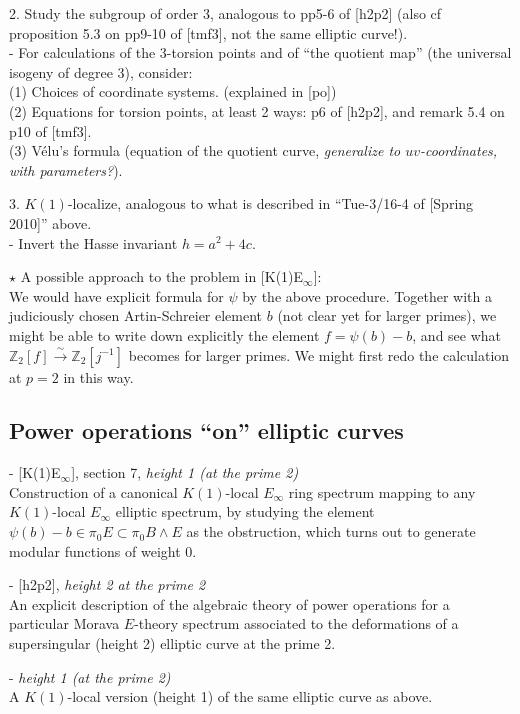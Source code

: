 \documentclass{rs}
\theoremstyle{definition}
\theoremstyle{remark}
\renewcommand{\=}{\approx}
\renewcommand{\-}{\sim}
\numberwithin{equation}{section}
\numberwithin{thm}{section}
\begin{document}
2. Study the subgroup of order 3, analogous to pp5-6 of [h2p2] (also cf proposition 5.3 on pp9-10 of [tmf3], not the same elliptic curve!).\\
- For calculations of the 3-torsion points and of ``the quotient map'' (the universal isogeny of degree 3), consider:\\
(1) Choices of coordinate systems. (explained in [po])\\
(2) Equations for torsion points, at least 2 ways: p6 of [h2p2], and remark 5.4 on p10 of [tmf3].\\
(3) V\'elu's formula (equation of the quotient curve, \textit{generalize to $uv$-coordinates, with parameters?}).

3. $K(1)$-localize, analogous to what is described in ``Tue-3/16-4 of [Spring 2010]'' above.\\
- Invert the Hasse invariant $h = a^2 + 4c$.

$\star$ A possible approach to the problem in [K(1)E$_\infty$]:\\
We would have explicit formula for $\psi$ by the above procedure. Together with a judiciously chosen Artin-Schreier element $b$ 
(not clear yet for larger primes), we might be able to write down explicitly the element $f = \psi(b) - b$, and see what 
$\mathbb{Z}_2 [f] \stackrel{\sim}{\rightarrow} \mathbb{Z}_2 [j^{-1}]$ becomes for larger primes. We might first redo the calculation at $p=2$ in this way.


\newpage
\subsection{Power operations ``on'' elliptic curves}

- [K(1)E$_\infty$], section 7, \textit{height 1 (at the prime 2)}\\
Construction of a canonical $K(1)$-local $E_\infty$ ring spectrum mapping to any $K(1)$-local $E_\infty$ elliptic spectrum, 
by studying the element $\psi(b) - b \in \pi_0 E \subset \pi_0 B \wedge E$ as the obstruction, 
which turns out to generate modular functions of weight 0.

- [h2p2], \textit{height 2 at the prime 2}\\
An explicit description of the algebraic theory of power operations for a particular Morava $E$-theory spectrum 
associated to the deformations of a supersingular (height 2) elliptic curve at the prime 2.

- \textit{height 1 (at the prime 2)}\\
A $K(1)$-local version (height 1) of the same elliptic curve as above.
\end{document}
